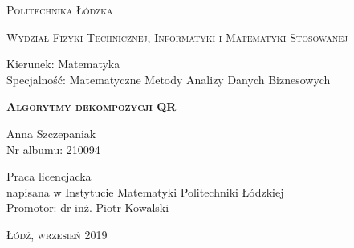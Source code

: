 \documentclass[12pt,a4paper]{report}
\begin{document}



\begin{titlepage}
\begin{flushleft}
\end{flushleft}
\begin{center}
\textsc{{\huge Politechnika Łódzka}}
\end{center}
\bigskip
\bigskip
\begin{center}
\textsc{{\Large Wydział Fizyki Technicznej, Informatyki i Matematyki Stosowanej}}
\end{center}
\bigskip
\bigskip
\begin{Large}
Kierunek: Matematyka\\   
Specjalność: Matematyczne Metody Analizy Danych Biznesowych %

\end{Large}
\bigskip
\bigskip
\bigskip
\bigskip
\noindent\hrulefill
\begin{center}
\textsc{\textbf{{\Large Algorytmy dekompozycji QR %
\\}}}
\end{center}
\bigskip
\bigskip
\begin{flushright}
{\large 
Anna Szczepaniak %
\\
Nr albumu: 
210094 %
\\}
\end{flushright}
\noindent\hrulefill
\bigskip
\bigskip
\bigskip
\bigskip
\begin{center}
{\large Praca licencjacka\\ %
napisana w Instytucie Matematyki Politechniki Łódzkiej\\ 
\bigskip
\bigskip
\bigskip
\bigskip
Promotor: dr inż. Piotr Kowalski %
 }
\end{center}
\bigskip
\bigskip
\bigskip
\bigskip
\begin{center}
{\textsc{\large Łódź, wrzesień 2019 %
}}
\end{center}
\end{titlepage}



\tableofcontents
\end{document}
